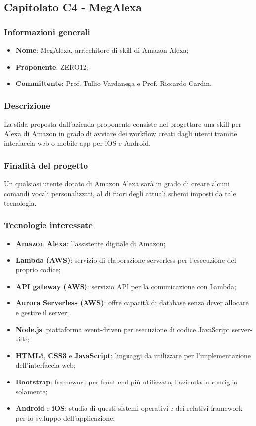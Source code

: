 \subsection{Capitolato C4 - MegAlexa}
\subsubsection{Informazioni generali}
\begin{itemize}
    \item \textbf{Nome}: MegAlexa, arricchitore di skill\glo{} di Amazon Alexa;
	\item \textbf{Proponente}: ZERO12; 
	\item \textbf{Committente}: Prof. Tullio Vardanega e Prof. Riccardo Cardin.
\end{itemize}
\subsubsection{Descrizione}
La sfida proposta dall'azienda proponente consiste nel progettare una skill\glo{} per 
Alexa di Amazon
in grado di avviare dei workflow\glo{} creati dagli utenti tramite interfaccia web o
mobile app per iOS e Android.

\subsubsection{Finalità del progetto}
Un qualsiasi utente dotato di Amazon Alexa sarà in grado di creare alcuni comandi vocali personalizzati, al di fuori degli attuali schemi imposti da tale tecnologia. 
\subsubsection{Tecnologie interessate}
\begin{itemize}
    \item \textbf{Amazon Alexa}: l'assistente digitale di Amazon;
    \item \textbf{Lambda (AWS\glo)}: servizio di elaborazione serverless per 
l'esecuzione del proprio codice;
    \item \textbf{API gateway (AWS\glo)}: servizio API per la comunicazione con 
Lambda;
    \item \textbf{Aurora Serverless (AWS\glo)}: offre capacità di database senza 
dover allocare e gestire il server;
    \item \textbf{Node.js\glo}: piattaforma event-driven\glo{} per esecuzione di codice 
JavaScript server-side\glo{};
    \item \textbf{HTML5}, \textbf{CSS3} e \textbf{JavaScript}: linguaggi da 
utilizzare per l'implementazione
    dell'interfaccia web;
    \item \textbf{Bootstrap}: framework\glo{} per front-end\glo{} più utilizzato, l'azienda 
lo consiglia solamente;
	\item \textbf{Android} e \textbf{iOS}: studio di questi sistemi operativi e 
	dei relativi framework\glo{} per lo sviluppo dell'applicazione. 

\end{itemize}
